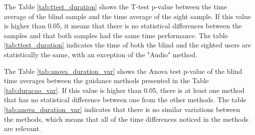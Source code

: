 %

The Table \ref{tab:ttest_duration} shows the T-test p-value between the time average of the blind sample and the time average of the sight sample. If this value is higher than 0.05, it means that there is no statistical differences between the samples and that both samples had the same time performance. The table \ref{tab:ttest_duration} indicates the time of both the blind and the sighted users are statistically the same, with an exception of the "Audio" method.

%

\begin{table}[!htb]
    \begin{minipage}{.45\linewidth}
        
    \end{minipage}
    \hfill
    \begin{minipage}{.45\linewidth}
        \vspace{-1.5cm}
        
    \end{minipage}
\end{table}

The Table \ref{tab:anova_duration_var} shows the Anova test p-value of the blind time averages between the guidance methods presented in the Table \ref{tab:duracao_var}. If this value is higher than 0.05, there is at least one method that has no statistical difference between one from the other methods. The table \ref{tab:anova_duration_var} indicates that there is no similar variations between the methods, which means that all of the time differences noticed in the methods are relevant.







%
%

